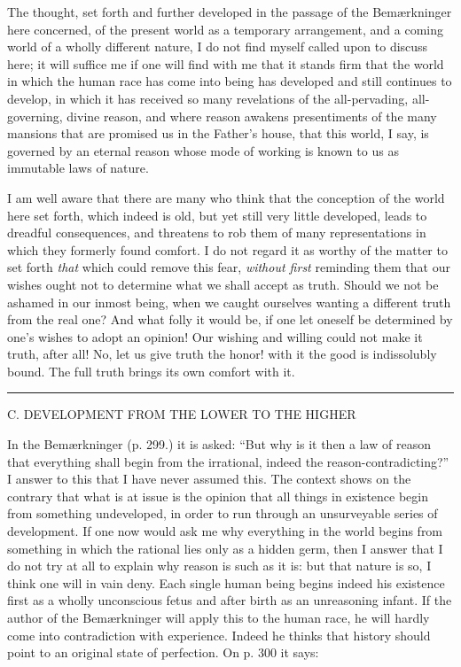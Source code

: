 \documentclass[12pt,a4paper,openany]{book}
\newcommand{\opage}[1]{\marginnote{\footnotesize\textit{[#1]}}}
\newcommand{\excerpthead}[1]{\par\bigskip\begin{center}#1\end{center}\nopagebreak\smallskip}
\newcommand{\sectionrule}{\par\begin{center}\rule{4em}{0.4pt}\end{center}}
\begin{document}
The thought, set forth and further developed in the passage of the Bemærkninger here
concerned, of the present world as a temporary arrangement, and a coming world of a
wholly different nature, I do not find myself called upon to discuss here; it will
suffice me if one will find with me that it stands firm that the world in which the
human race has come into being has developed and still continues to develop, in
which it has received so many revelations of the all-pervading, all-governing,
divine reason, and where reason awakens presentiments of the many mansions that are
promised us in the Father's house, that this world, I say, is governed by an eternal
reason whose mode of working is known to us as immutable laws of nature.

I am well aware that there are many who think that the conception of the world here
set forth, which indeed is old,
\setcounter{footnote}{0}%
\opage{77}but yet still very little developed, leads to dreadful consequences, and threatens
to rob them of many representations in which they formerly found comfort. I do not
regard it as worthy of the matter to set forth \emph{that} which could remove this
fear, \emph{without first} reminding them that our wishes ought not to determine
what we shall accept as truth. Should we not be ashamed in our inmost being, when we
caught ourselves wanting a different truth from the real one? And what folly it
would be, if one let oneself be determined by one's wishes to adopt an opinion! Our
wishing and willing could not make it truth, after all! No, let us give truth the
honor! with it the good is indissolubly bound. The full truth brings its own comfort
with it.

\sectionrule

\excerpthead{C. DEVELOPMENT FROM THE LOWER TO THE HIGHER}


In the Bemærkninger (p. 299.) it is asked: ``But why is it then a law of reason that
everything shall begin from the irrational, indeed the reason-contradicting?'' I
answer to this that I have never assumed this. The context shows on the contrary
that what is at issue is the opinion that all things in existence begin from
something undeveloped, in order to run through an unsurveyable series of
development. If one now would ask me why everything in the world begins from
something in which the rational lies only as a hidden germ, then I answer that I do
not try at all to explain why reason is such as it is: but that nature is so, I
think one will in vain deny. Each single human being begins indeed his existence
first as a wholly unconscious fetus and after birth as an unreasoning infant. If the
author of the Bemærkninger will apply this to the human race, he will hardly come
into contradiction with experience. Indeed he thinks that history should point to an
original state of perfection. On p. 300 it says:
\end{document}
